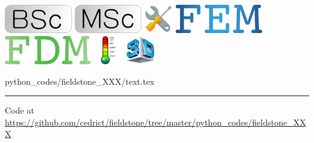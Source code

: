 \noindent
\includegraphics[height=1.25cm]{images/pictograms/bsc}
\includegraphics[height=1.25cm]{images/pictograms/msc}
\includegraphics[height=1.25cm]{images/pictograms/tools}
\includegraphics[height=1.25cm]{images/pictograms/FEM}
\includegraphics[height=1.25cm]{images/pictograms/FDM}
\includegraphics[height=1.25cm]{images/pictograms/temperature}
\includegraphics[height=1.25cm]{images/pictograms/3d}



\begin{flushright} {\tiny {\color{gray} python\_codes/fieldstone\_XXX/text.tex}} \end{flushright}



\par\noindent\rule{\textwidth}{0.4pt}

\begin{center}
Code at \url{https://github.com/cedrict/fieldstone/tree/master/python_codes/fieldstone_XXX}
\end{center}

